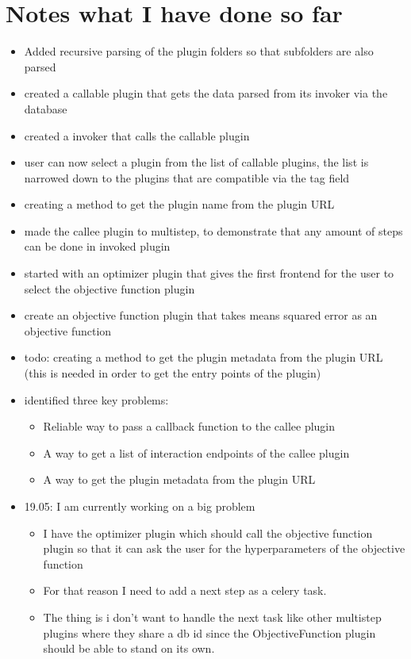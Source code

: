 \documentclass[
  a4paper,  %
  twoside,  %
  bibliography=totoc,
  headsepline,
  cleardoublepage=empty,
  parskip=half,
  draft=false
]{scrbook}
\begin{document}
\chapter{Notes what I have done so far}
\begin{itemize}
  \item Added recursive parsing of the plugin folders so that subfolders are also parsed
  \item created a callable plugin that gets the data parsed from its invoker via the database
  \item created a invoker that calls the callable plugin
  \item user can now select a plugin from the list of callable plugins, the list is narrowed down to the plugins that are compatible via the tag field
  \item creating a method to get the plugin name from the plugin URL
  \item made the callee plugin to multistep, to demonstrate that any amount of steps can be done in invoked plugin
  \item started with an optimizer plugin that gives the first frontend for the user to select the objective function plugin
  \item create an objective function plugin that takes means squared error as an objective function
  \item todo: creating a method to get the plugin metadata from the plugin URL (this is needed in order to get the entry points of the plugin)
  \item identified three key problems:
  \begin{itemize}
    \item Reliable way to pass a callback function to the callee plugin
    \item A way to get a list of interaction endpoints of the callee plugin
    \item A way to get the plugin metadata from the plugin URL
  \end{itemize}
  \item 19.05: I am currently working on a big problem
  \begin{itemize}
    \item I have the optimizer plugin which should call the objective function plugin so that it can ask the user for the hyperparameters of the objective function
    \item For that reason I need to add a next step as a celery task. 
    \item The thing is i don't want to handle the next task like other multistep plugins where they share a db id since the ObjectiveFunction plugin should be able to stand on its own.

\end{itemize}
\end{itemize}
\end{document}
